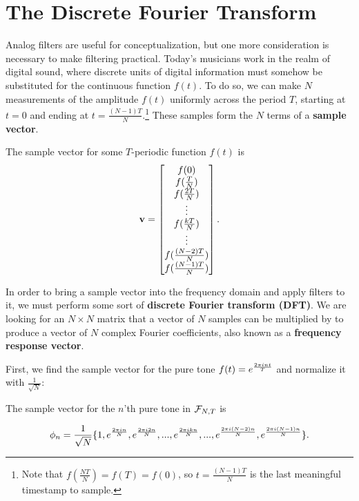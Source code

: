 
\newpage

\section{The Discrete Fourier Transform}

\par \indentt Analog filters are useful for conceptualization, but one more consideration is necessary to make filtering practical. Today's musicians work in the realm of digital sound, where discrete units of digital information must somehow be substituted for the continuous function $f(t)$. To do so, we can make $N$ measurements of the amplitude $f(t)$ uniformly across the period $T$, starting at $t = 0$ and ending at $t = \frac{(N-1)T}{N}$.\footnote{Note that $f(\frac{NT}{N}) = f(T) = f(0)$, so $t = \frac{(N-1)T}{N}$ is the last meaningful timestamp to sample.} These samples form the $N$ terms of a \textbf{sample vector}.

\begin{example}{The sample vector for some $T$-periodic function $f(t)$ is}
    $$\mathbf{v} = \begin{bmatrix}
                f(0)\\
                f(\frac{T}{N})\\
                f(\frac{2T}{N})\\
                \vdots\\
                f(\frac{kT}{N})\\
                \vdots\\
                f(\frac{(N-2)T}{N})\\
                f(\frac{(N-1)T}{N})
    \end{bmatrix}.$$
\end{example}

\par In order to bring a sample vector into the frequency domain and apply filters to it, we must perform some sort of \textbf{discrete Fourier transform (DFT)}. We are looking for an $N\times N$ matrix that a vector of $N$ samples can be multiplied by to produce a vector of $N$ complex Fourier coefficients, also known as a \textbf{frequency response vector}.

\par \bigskip First, we find the sample vector for the pure tone $f(t) = e^{\frac{2 \pi i nt}{T}}$ and normalize it with $\frac{1}{\sqrt{N}}$:

\begin{example}
    The sample vector for the $n$'th pure tone in $\mathcal{F}_{N,T}$ is
    
    $$\phi_n = \frac{1}{\sqrt{N}} \{1,e^{\frac{2 \pi i n}{N}},e^{\frac{2 \pi i 2n}{N}},...,e^{\frac{2 \pi i kn}{N}},...,e^{\frac{2 \pi i (N-2)n}{N}},e^{\frac{2 \pi i (N-1)n}{N}}\}.$$
\end{example}

